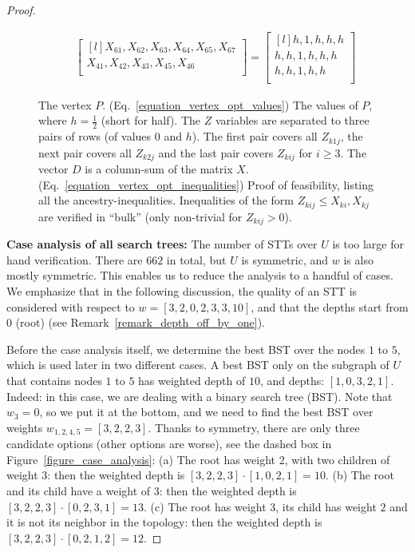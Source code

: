\begin{proof}
\begin{figure}[ht]
{\begin{subfigure}{0.9\textwidth}
\begin{equation}
\begin{split}
\begin{bmatrix*}[l]
            X_{61},X_{62},X_{63},X_{64},X_{65},X_{67} \\
            X_{41},X_{42},X_{43},X_{45},X_{46} \\
            \end{bmatrix*}
        =
            \begin{bmatrix*}[l]
            h,1,h,h,h \\
            h,h,1,h,h,h \\
            h,h,1,h,h \\
            \end{bmatrix*}
        \end{split}
        \end{equation}
    \end{subfigure}
    }
    
\caption{\footnotesize{The vertex $P$. (Eq.~\ref{equation_vertex_opt_values}) The values of $P$, where $h = \frac{1}{2}$ (short for half). The $Z$ variables are separated to three pairs of rows (of values $0$ and $h$). The first pair covers all $Z_{k1j}$, the next pair covers all $Z_{k2j}$ and the last pair covers $Z_{kij}$ for $i \ge 3$. The vector $D$ is a column-sum of the matrix $X$. (Eq.~\ref{equation_vertex_opt_inequalities}) Proof of feasibility, listing all the ancestry-inequalities. Inequalities of the form $Z_{kij} \le X_{ki},X_{kj}$ are verified in ``bulk'' (only non-trivial for $Z_{kij} > 0$).}}
\label{figure_explicit_counter_example}
\end{figure}

\textbf{Case analysis of all search trees:}
The number of STTs over $U$ is too large for hand verification. There are $662$ in total, but  $U$ is symmetric, and $w$ is also mostly symmetric. This enables us to reduce the analysis to a handful of cases. We emphasize that in the following discussion, the quality of an STT is considered with respect to $w = [3,2,0,2,3,3,10]$, and that the depths start from $0$ (root) (see Remark~\ref{remark_depth_off_by_one}).

Before the case analysis itself, we determine the best BST over the nodes $1$ to $5$, which is used later in two different cases. A best BST only on the subgraph of $U$ that contains nodes $1$ to $5$ has weighted depth of $10$, and depths: $[1,0,3,2,1]$. Indeed: in this case, we are dealing with a binary search tree (BST). Note that $w_3 = 0$, so we put it at the bottom, and we need to find the best BST over weights $w_{1,2,4,5}=[3,2,2,3]$. Thanks to symmetry, there are only three candidate options (other options are worse), see the dashed box in Figure~\ref{figure_case_analysis}: (a) The root has weight 2, with two children of weight $3$: then the weighted depth is $[3,2,2,3] \cdot [1,0,2,1] = 10$. (b) The root and its child have a weight of 3: then the weighted depth is $[3,2,2,3] \cdot [0,2,3,1] = 13$. (c) The root has weight 3, its child has weight $2$ and it is not its neighbor in the topology: then the weighted depth is $[3,2,2,3] \cdot [0,2,1,2] = 12$.


\end{proof}
